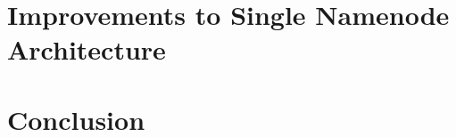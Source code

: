 \documentclass[11pt, a4paper]{article}
\begin{document}
\begin{multicols*}{2}



\section{Improvements to Single Namenode Architecture}



\section{Conclusion}






\end{multicols*}
\end{document}

